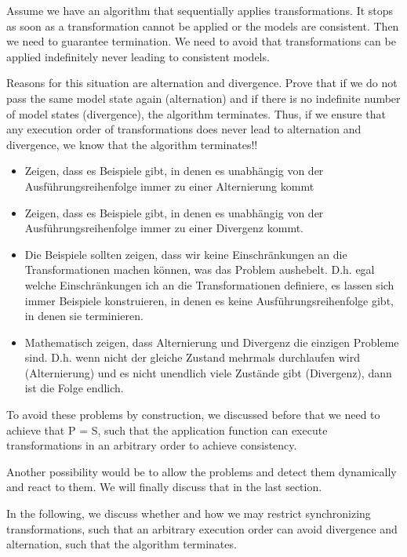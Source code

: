 Assume we have an algorithm that sequentially applies transformations.
It stops as soon as a transformation cannot be applied or the models are consistent.
Then we need to guarantee termination.
We need to avoid that transformations can be applied indefinitely never leading to consistent models.

Reasons for this situation are alternation and divergence.
Prove that if we do not pass the same model state again (alternation) and if there is no indefinite number of model states (divergence), the algorithm terminates.
Thus, if we ensure that any execution order of transformations does never lead to alternation and divergence, we know that the algorithm terminates!!

\begin{itemize}
    \item Zeigen, dass es Beispiele gibt, in denen es unabhängig von der Ausführungsreihenfolge immer zu einer Alternierung kommt
    \item Zeigen, dass es Beispiele gibt, in denen es unabhängig von der Ausführungsreihenfolge immer zu einer Divergenz kommt.
    \item Die Beispiele sollten zeigen, dass wir keine Einschränkungen an die Transformationen machen können, was das Problem aushebelt. D.h. egal welche Einschränkungen ich an die Transformationen definiere, es lassen sich immer Beispiele konstruieren, in denen es keine Ausführungsreihenfolge gibt, in denen sie terminieren.
    \item Mathematisch zeigen, dass Alternierung und Divergenz die einzigen Probleme sind. D.h. wenn nicht der gleiche Zustand mehrmals durchlaufen wird (Alternierung) und es nicht unendlich viele Zustände gibt (Divergenz), dann ist die Folge endlich.
\end{itemize}

To avoid these problems by construction, we discussed before that we need to achieve that P = S, such that the application function can execute transformations in an arbitrary order to achieve consistency.

Another possibility would be to allow the problems and detect them dynamically and react to them.
We will finally discuss that in the last section.

In the following, we discuss whether and how we may restrict synchronizing transformations, such that an arbitrary execution order can avoid divergence and alternation, such that the algorithm terminates.



